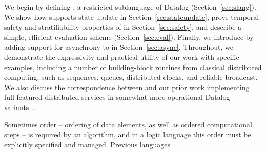 We begin by defining \slang, a restricted sublanguage of Datalog
(Section~\ref{sec:slang}). We show how \slang supports state update in
Section~\ref{sec:stateupdate}, prove temporal safety and
stratifiability properties of \slang in Section~\ref{sec:safety}, and
describe a simple, efficient evaluation scheme
(Section~\ref{sec:eval}). Finally, we introduce \lang by adding
support for asynchrony to \slang in
Section~\ref{sec:async}. Throughout, we demonstrate the expressivity
and practical utility of our work with specific examples, including a
number of building-block routines from classical distributed
computing, such as sequences, queues, distributed clocks, and reliable
broadcast.  We also discuss the correspondence between \lang and our
prior work implementing full-featured distributed services in somewhat
more operational Datalog variants~\cite{boom-eurosys,Loo2009-CACM}.

Sometimes order -- ordering of data elements, as well as ordered computational steps -- 
is required by an algorithm, and in a logic language this order must be explicitly specified and 
managed.  Previous languages 




